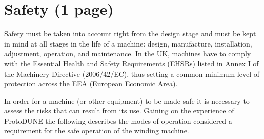 \section{Safety (1 page)}
\label{sec:fdsp-apa-safety}

Safety must be taken into account right from the design stage and must be kept in mind at all stages in the life of a machine: design, manufacture, installation, adjustment, operation, and maintenance. In the UK, machines have to comply with the Essential Health and Safety Requirements (EHSRs) listed in Annex I of the Machinery Directive (2006/42/EC), thus setting a common minimum level of protection across the EEA (European Economic Area).

In order for a machine (or other equipment) to be made safe it is necessary to assess the risks that can result from its use. Gaining on the experience of ProtoDUNE the following describes the modes of operation considered a requirement for the safe operation of the winding machine.

